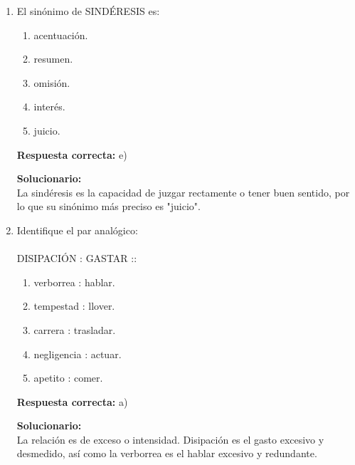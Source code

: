 \begin{enumerate}
	\vspace{2mm}
	\textbf{Solucionario:}\\
	La palabra "impulso" se ajusta a la naturaleza interna de la vocación, mientras que "quehacer" se refiere a la actividad o tarea a la que uno se dedica.
	
	\vspace{6mm}
	
	\item El sinónimo de SINDÉRESIS es:
	\begin{enumerate}[label=\alph*)]
		\item acentuación.
		\item resumen.
		\item omisión.
		\item interés.
		\item juicio.
	\end{enumerate}
	\textbf{Respuesta correcta:} e)
	
	\vspace{2mm}
	\textbf{Solucionario:}\\
	La sindéresis es la capacidad de juzgar rectamente o tener buen sentido, por lo que su sinónimo más preciso es "juicio".
	
	\vspace{6mm}
	
	\item Identifique el par analógico:\\
	\\
	DISIPACIÓN : GASTAR ::
	\begin{enumerate}[label=\alph*)]
		\item verborrea : hablar.
		\item tempestad : llover.
		\item carrera : trasladar.
		\item negligencia : actuar.
		\item apetito : comer.
	\end{enumerate}
	\textbf{Respuesta correcta:} a)
	
	\vspace{2mm}
	\textbf{Solucionario:}\\
	La relación es de exceso o intensidad. Disipación es el gasto excesivo y desmedido, así como la verborrea es el hablar excesivo y redundante.
	
	\vspace{6mm}
	

\end{enumerate}
